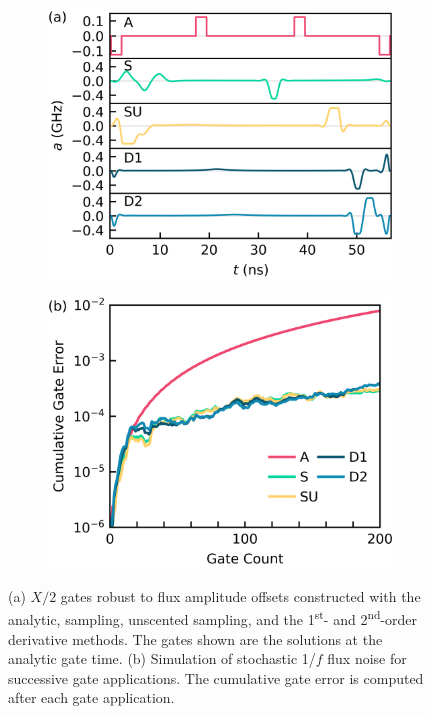 \begin{figure}[ht]
  \begin{subfigure}{.4\textwidth}
    \includegraphics[width=\linewidth]{assets/f3a.png}
    \caption{}
    \label{fig:stochastica}
  \end{subfigure}\hspace{0.05\textwidth}
  \begin{subfigure}{.4\textwidth}
    \includegraphics[width=\linewidth]{assets/f3b.png}
        \caption{}
    \label{fig:stochasticb}
  \end{subfigure}
  \caption{
    (a) $X/2$ gates robust to flux amplitude offsets constructed with the analytic,
    sampling, unscented sampling, and the 1\textsuperscript{st}-
    and 2\textsuperscript{nd}-order derivative methods. The gates shown
    are the solutions at the analytic gate time.
    (b) Simulation of stochastic 1/$f$ flux noise for
    successive gate applications. The cumulative
    gate error is computed after each gate application.
  }
  \label{fig:stochastic}
\end{figure}
